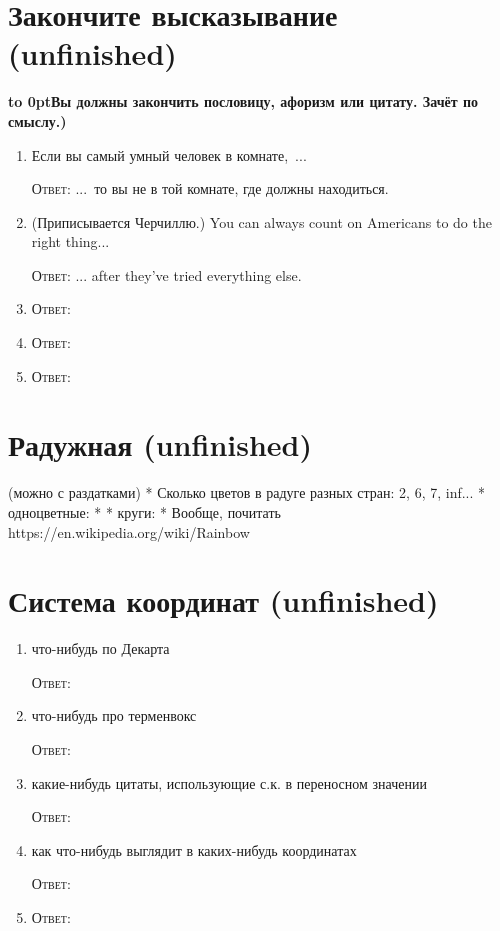 \documentclass[a4paper,10pt]{article}
\let\keyword\textsc
\newenvironment{topic}{\begin{enumerate}}{\end{enumerate}}
\newcommand{\question}[3]{\item[#1.] #2 \par \keyword{Ответ:} #3}
\newcommand{\topiccommentary}[1]{\begin{adjustwidth}{0.9cm}{} \vspace{-0.3em}\textbf{\hbox to 0pt{\hss{(}}#1)} \end{adjustwidth}}
\begin{document}
\section{Закончите высказывание (unfinished)}
\topiccommentary{Вы должны закончить пословицу, афоризм или цитату. Зачёт по смыслу.}

\begin{topic}
 \question{??}{Если вы самый умный человек в комнате,~...}{...~то вы не в той комнате, где должны находиться.}
 \question{??}{(Приписывается Черчиллю.) You can always count on Americans to do the right thing...}{... after they’ve tried everything else.}
 \question{??}{}{}
 \question{??}{}{}
 \question{??}{}{}
\end{topic}


\section{Радужная (unfinished)}
(можно с раздатками)
* Сколько цветов в радуге разных стран: 2, 6, 7, inf...
* одноцветные:
*
* круги:
*
Вообще, почитать https://en.wikipedia.org/wiki/Rainbow


\section{Система координат (unfinished)}

\begin{topic}
 \question{??}{что-нибудь по Декарта}{}
 \question{??}{что-нибудь про терменвокс}{}
 \question{??}{какие-нибудь цитаты, использующие с.к. в переносном значении}{}
 \question{??}{как что-нибудь выглядит в каких-нибудь координатах}{}
 \question{??}{}{}
\end{topic}
\end{document}
